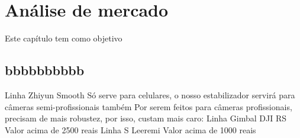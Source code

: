 \chapter{Análise de mercado}

\label{CAP4}


Este capítulo tem como objetivo 


\section{bbbbbbbbbb}\label{Sub:equa}

Linha Zhiyun Smooth 
Só serve para celulares, o nosso estabilizador servirá para câmeras semi-profissionais  também
Por serem feitos para câmeras profissionais, precisam de mais robustez, por isso, custam mais caro:
Linha Gimbal DJI RS
Valor acima de 2500 reais
Linha S Leeremi
Valor acima de 1000 reais

